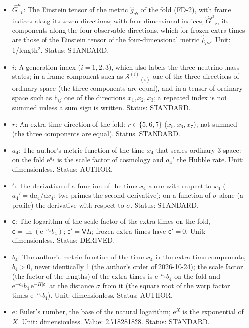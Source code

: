 \documentclass[
  10pt,
]{article}
\providecommand{\tightlist}{%
  \setlength{\itemsep}{0pt}\setlength{\parskip}{0pt}}
\begin{document}
\begin{itemize}
\tightlist
\item
  \(\hat G^\mu{}_\nu\): The Einstein tensor of the metric
  \(\hat g_{ab}\) of the fold (FD-2), with frame indices along its seven
  directions; with four-dimensional indices, \(\hat G^\mu{}_\nu\), its
  components along the four observable directions, which for frozen
  extra times are those of the Einstein tensor of the four-dimensional
  metric \(\hat h_{\mu\nu}\). Unit: 1/length\(^2\). Status: STANDARD.
\item
  \(i\): A generation index (\(i = 1, 2, 3\)), which also labels the
  three neutrino mass states; in a frame component such as
  \(\mathcal{S}^{(i)}{}_{(i)}\) one of the three directions of ordinary
  space (the three components are equal), and in a tensor of ordinary
  space such as \(\mathsf{h}_{ij}\) one of the directions
  \(x_1, x_2, x_3\); a repeated index is not summed unless a sum sign is
  written. Status: STANDARD.
\item
  \(r\): An extra-time direction of the fold: \(r \in \{5, 6, 7\}\)
  (\(x_5, x_6, x_7\)); not summed (the three components are equal).
  Status: STANDARD.
\item
  \(a_4\): The author's metric function of the time \(x_4\) that scales
  ordinary 3-space: on the fold \(\mathrm{e}^{a_4}\) is the scale factor
  of cosmology and \(a_4'\) the Hubble rate. Unit: dimensionless.
  Status: AUTHOR.
\item
  \({}'\): The derivative of a function of the time \(x_4\) alone with
  respect to \(x_4\) (\(a_4' = \mathrm{d}a_4/\mathrm{d}x_4\); two primes
  the second derivative); on a function of \(\sigma\) alone (a profile)
  the derivative with respect to \(\sigma\). Status: STANDARD.
\item
  \(\mathsf{c}\): The logarithm of the scale factor of the extra times
  on the fold, \(\mathsf{c} = \ln(\mathrm{e}^{-a_4}b_4)\);
  \(\mathsf{c}' = \mathsf{V}H\); frozen extra times have
  \(\mathsf{c}' = 0\). Unit: dimensionless. Status: DERIVED.
\item
  \(b_4\): The author's metric function of the time \(x_4\) in the
  extra-time components, \(b_4 > 0\), never identically 1 (the author's
  order of 2026-10-24); the scale factor (the factor of the lengths) of
  the extra times is \(\mathrm{e}^{-a_4}b_4\) on the fold and
  \(\mathrm{e}^{-a_4}b_4\,\mathrm{e}^{-H\lvert\sigma\rvert}\) at the
  distance \(\sigma\) from it (the square root of the warp factor times
  \(\mathrm{e}^{-a_4}b_4\)). Unit: dimensionless. Status: AUTHOR.
\item
  \(\mathrm{e}\): Euler's number, the base of the natural logarithm;
  \(\mathrm{e}^{X}\) is the exponential of \(X\). Unit: dimensionless.
  Value: 2.718281828. Status: STANDARD.
\end{itemize}
\end{document}
